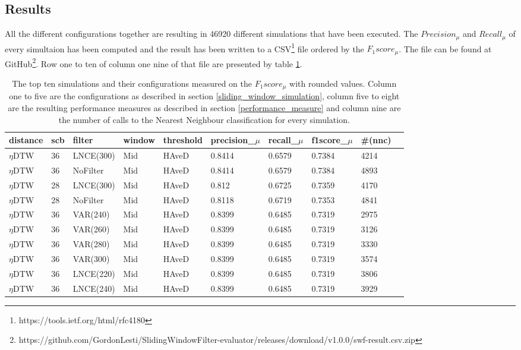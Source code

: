 \subsection{Results} \label{results}
All the different configurations together are resulting in 46920 different simulations that have been executed. The
$Precision_{\mu}$ and $Recall_{\mu}$ of every simultaion has been computed and the result has been written to a
CSV\footnote{https://tools.ietf.org/html/rfc4180} file ordered by the $F_{1}score_{\mu}$. The file can be found at
GitHub\footnote{https://github.com/GordonLesti/SlidingWindowFilter-evaluator/releases/download/v1.0.0/swf-result.csv.zip}.
Row one to ten of column one nine of that file are presented by table \ref{tab:result}.

\begin{table}[H]
    \begin{center}
        {\scriptsize
            \begin{tabular}{l l l l l l l l l l}
                \textbf{distance} & \textbf{scb} & \textbf{filter} & \textbf{window} & \textbf{threshold} & \textbf{precision\_$\mu$} & \textbf{recall\_$\mu$} & \textbf{f1score\_$\mu$} & \textbf{\#(nnc)}\\
                \hline
                $\eta$DTW & 36 & LNCE(300) & Mid  & HAveD & 0.8414 & 0.6579 & 0.7384 & 4214\\
                $\eta$DTW & 36 & NoFilter & Mid  & HAveD & 0.8414 & 0.6579 & 0.7384 & 4893\\
                $\eta$DTW & 28 & LNCE(300) & Mid  & HAveD & 0.812 & 0.6725 & 0.7359 & 4170\\
                $\eta$DTW & 28 & NoFilter & Mid  & HAveD & 0.8118 & 0.6719 & 0.7353 & 4841\\
                $\eta$DTW & 36 & VAR(240) & Mid  & HAveD & 0.8399 & 0.6485 & 0.7319 & 2975\\
                $\eta$DTW & 36 & VAR(260) & Mid & HAveD & 0.8399 & 0.6485 & 0.7319 & 3126\\
                $\eta$DTW & 36 & VAR(280) & Mid & HAveD & 0.8399 & 0.6485 & 0.7319 & 3330\\
                $\eta$DTW & 36 & VAR(300) & Mid & HAveD & 0.8399 & 0.6485 & 0.7319 & 3574\\
                $\eta$DTW & 36 & LNCE(220) & Mid & HAveD & 0.8399 & 0.6485 & 0.7319 & 3806\\
                $\eta$DTW & 36 & LNCE(240) & Mid & HAveD & 0.8399 & 0.6485 & 0.7319 & 3929\\
            \end{tabular}
        }
    \end{center}
    \caption{The top ten simulations and their configurations measured on the $F_{1}score_{\mu}$ with rounded values.
    Column one to five are the configurations as described in section \ref{sliding_window_simulation}, column five to
    eight are the resulting performance measures as described in section \ref{performance_measure} and column nine are
    the number of calls to the Nearest Neighbour classification for every simulation.}
	\label{tab:result}
\end{table}

